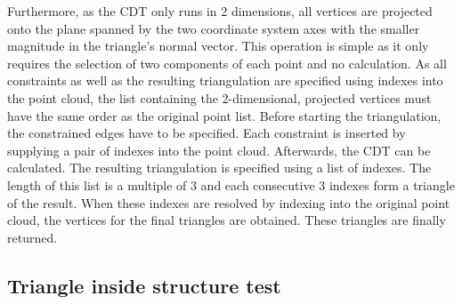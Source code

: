 Furthermore, as the CDT only runs in 2 dimensions, all vertices are projected onto the plane spanned by the two coordinate system axes with the smaller magnitude in the triangle's normal vector.
This operation is simple as it only requires the selection of two components of each point and no calculation.
As all constraints as well as the resulting triangulation are specified using indexes into the point cloud, the list containing the 2-dimensional, projected vertices must have the same order as the original point list.
Before starting the triangulation, the constrained edges have to be specified.
Each constraint is inserted by supplying a pair of indexes into the point cloud.
Afterwards, the CDT can be calculated.
The resulting triangulation is specified using a list of indexes.
The length of this list is a multiple of 3 and each consecutive 3 indexes form a triangle of the result.
When these indexes are resolved by indexing into the original point cloud, the vertices for the final triangles are obtained.
These triangles are finally returned.


\subsection{Triangle inside structure test}
\label{sec:triangle_inside_test}

